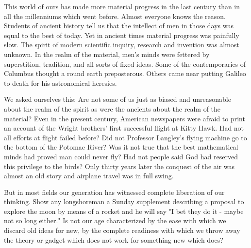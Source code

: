 \begin{biblechapter}
    This world of ours has made more material progress in the last century than in all the millenniums which went before. 
Almost everyone knows the reason. 
Students of ancient history tell us that the intellect of men in those days was equal to the best of today. 
Yet in ancient times material progress was painfully slow. 
The spirit of modern scientific inquiry, research and invention was almost unknown. 
In the realm of the material, men's minds were fettered by superstition, tradition, and all sorts of fixed ideas. 
Some of the contemporaries of Columbus thought a round earth preposterous. 
Others came near putting Galileo to death for his astronomical heresies.

We asked ourselves this: 
Are not some of us just as biased and unreasonable about the realm of the spirit 
as were the ancients about the realm of the material? 
Even in the present century, American newspapers were afraid to print an account of the Wright brothers' first successful flight at Kitty Hawk. 
Had not all efforts at flight failed before? 
Did not Professor Langley's flying machine go to the bottom of the Potomac River? 
Was it not true that the best mathematical minds had proved man could never fly? 
Had not people said God had reserved this privilege to the birds? 
Only thirty years later the conquest of the air was almost an old story and airplane travel was in full swing.

But in most fields our generation has witnessed complete liberation of our thinking. 
Show any longshoreman a Sunday supplement describing a proposal to explore the moon by means of a rocket and he will say 
"I bet they do it - maybe not so long either." 
Is not our age characterized by the ease with which we discard old ideas for new, 
by the complete readiness with which we throw away the theory or gadget which does not work for something new which does?
\end{biblechapter}


